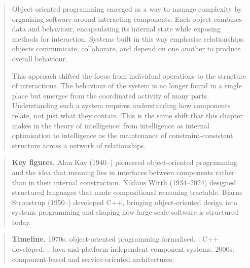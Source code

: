 \documentclass[11pt]{book}
\theoremstyle{plain}
\theoremstyle{definition}
\theoremstyle{remark}
\newenvironment{historicalpreamble}
  {\begin{quote}\small}
  {\end{quote}}
\newenvironment{historicalfigures}
  {\begin{quote}\small\textbf{Key figures.}\enspace\ignorespaces}
  {\end{quote}}
\newenvironment{paradigmtimeline}
  {\begin{quote}\small\textbf{Timeline.}\enspace\ignorespaces}
  {\end{quote}}
\begin{document}
\begin{historicalpreamble}
Object-oriented programming emerged as a way to manage complexity by
organising software around interacting components. Each object combines
data and behaviour, encapsulating its internal state while exposing
methods for interaction. Systems built in this way emphasise
relationships: objects communicate, collaborate, and depend on one
another to produce overall behaviour.

This approach shifted the focus from individual operations to the
structure of interactions. The behaviour of the system is no longer
found in a single place but emerges from the coordinated activity of
many parts. Understanding such a system requires understanding how
components relate, not just what they contain. This is the same shift
that this chapter makes in the theory of intelligence: from intelligence
as internal optimisation to intelligence as the maintenance of
constraint-consistent structure across a network of relationships.
\end{historicalpreamble}

\begin{historicalfigures}
Alan Kay (1940--) pioneered object-oriented programming and the idea
that meaning lies in interfaces between components rather than in their
internal construction. Niklaus Wirth (1934--2024) designed structured
languages that made compositional reasoning tractable. Bjarne Stroustrup
(1950--) developed C++, bringing object-oriented design into systems
programming and shaping how large-scale software is structured today.
\end{historicalfigures}

\begin{paradigmtimeline}
1970s: object-oriented programming formalised. : C++ developed. : Java and platform-independent component systems. \quad
2000s: component-based and service-oriented architectures.
\end{paradigmtimeline}
\end{document}

